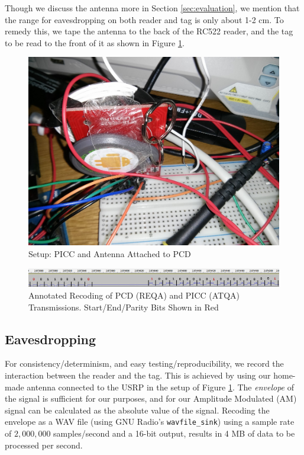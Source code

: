 \documentclass[fleqn,10pt]{SelfArx} %
\begin{document}
Though we discuss the antenna more in Section \ref{sec:evaluation}, we mention that the range for eavesdropping on both reader and tag is only about 1-2 cm. To remedy this, we tape the antenna to the back of the RC522 reader, and the tag to be read to the front of it as shown in Figure \ref{fig:setup}.


\begin{figure}[tp]
  \includegraphics[width=\linewidth]{img/setup}
  \caption{Setup: PICC and Antenna Attached to PCD}
  \label{fig:setup}
\end{figure}


\begin{figure}[!t]
  \includegraphics[width=\textwidth]{img/annotated}
  \caption{Annotated Recoding of PCD (REQA) and PICC (ATQA) Transmissions. Start/End/Parity Bits Shown in Red}
  \label{fig:annotated}
\end{figure}



\subsection{Eavesdropping}
\label{subsec:eavesdrop}

For consistency/determinism, and easy testing/reproducibility, we record the interaction between the reader and the tag. This is achieved by using our home-made antenna connected to the USRP in the setup of Figure \ref{fig:setup}. The {\em envelope} of the signal is sufficient for our purposes, and for our Amplitude Modulated (AM) signal can be calculated as the absolute value of the signal. Recoding the envelope as a WAV file (using GNU Radio's \texttt{wavfile\_sink}) using a sample rate of $2,000,000$ samples/second and a 16-bit output, results in 4 MB of data to be processed per second.
\end{document}
